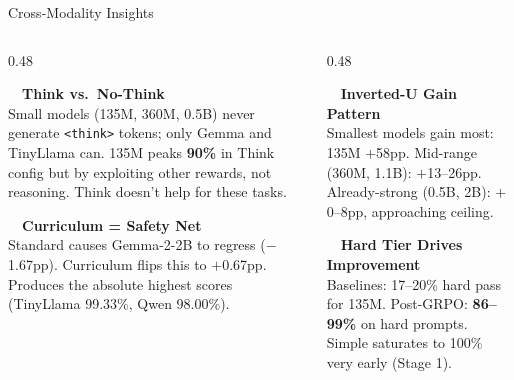 \documentclass[10pt, aspectratio=169]{beamer}
\begin{document}
\begin{frame}{Cross-Modality Insights}
  \vspace{0.2em}
  \begin{columns}[T]
    \begin{column}{0.48\textwidth}
      \begin{tcolorbox}[insightbox=sky]
        \textcolor{sky}{\faBrain}~~\textbf{Think vs.\ No-Think}\\[3pt]
        \scriptsize Small models (135M, 360M, 0.5B) never generate \texttt{<think>} tokens;
        only Gemma and TinyLlama can.
        135M peaks \textbf{90\%} in Think config but by exploiting other rewards, not reasoning.
        Think doesn't help for these tasks.
      \end{tcolorbox}
      \vspace{0.4em}
      \begin{tcolorbox}[insightbox=accent]
        \textcolor{accent}{\faLock}~~\textbf{Curriculum = Safety Net}\\[3pt]
        \scriptsize Standard causes Gemma-2-2B to regress ($-$1.67pp).
        Curriculum flips this to $+$0.67pp.
        Produces the absolute highest scores (TinyLlama 99.33\%, Qwen 98.00\%).
      \end{tcolorbox}
    \end{column}
    \begin{column}{0.48\textwidth}
      \begin{tcolorbox}[insightbox=gold]
        \textcolor{gold}{\faChartArea}~~\textbf{Inverted-U Gain Pattern}\\[3pt]
        \scriptsize Smallest models gain most: 135M $+$58pp.
        Mid-range (360M, 1.1B): $+$13–26pp.
        Already-strong (0.5B, 2B): $+$0–8pp, approaching ceiling.
      \end{tcolorbox}
      \vspace{0.4em}
      \begin{tcolorbox}[insightbox=warn]
        \textcolor{warn}{\faExclamationTriangle}~~\textbf{Hard Tier Drives Improvement}\\[3pt]
        \scriptsize Baselines: 17–20\% hard pass for 135M.
        Post-GRPO: \textbf{86–99\%} on hard prompts.
        Simple saturates to 100\% very early (Stage 1).
      \end{tcolorbox}
    \end{column}
  \end{columns}
\end{frame}
\end{document}
